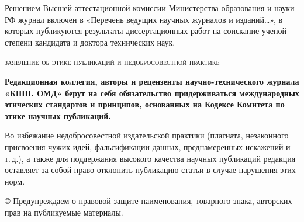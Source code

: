 \vfill

\scriptsize
Решением Высшей аттестационной комиссии Министерства образования и науки РФ журнал включен
в «Перечень ведущих научных журналов и изданий…», в которых публикуются результаты диссертационных работ на соискание
ученой степени кандидата и доктора технических наук.

\begin{center}
\textsc{заявление об этике публикаций и недобросовестной практике}
\end{center}
\vspace{-2em}
\begin{flushleft}
{\bfseries Редакционная коллегия, авторы и рецензенты научно-технического журнала «КШП. ОМД» берут на себя обязательство придерживаться международных этических стандартов и принципов, основанных на Кодексе Комитета по этике научных публикаций.

Во избежание недобросовестной издательской практики (плагиата, незаконного присвоения чужих идей, фальсификации данных,
преднамеренных искажений и т.\,д.), а также для поддержания высокого качества научных публикаций редакция оставляет за собой
право отклонить публикацию статьи в случае нарушения этих норм.}

\vspace{1em}
\noindent © Предупреждаем о правовой защите наименования, товарного знака, авторских прав на публикуемые материалы.
\end{flushleft}

\normalsize

